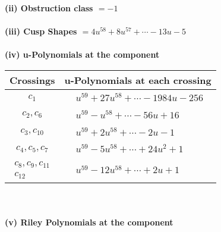 \documentclass[1p]{elsarticle_modified}
\theoremstyle{definition}
\begin{document}
\flushleft \textbf{(ii) Obstruction class $= -1$}\\~\\
\flushleft \textbf{(iii) Cusp Shapes $= 4 u^{58}+8 u^{57}+\cdots-13 u-5$}\\~\\
\newpage\renewcommand{\arraystretch}{1}
\flushleft \textbf{(iv) u-Polynomials at the component}\newline \\
\begin{tabular}{m{50pt}|m{274pt}}
Crossings & \hspace{64pt}u-Polynomials at each crossing \\
\hline $$\begin{aligned}c_{1}\end{aligned}$$&$\begin{aligned}
&u^{59}+27 u^{58}+\cdots-1984 u-256
\end{aligned}$\\
\hline $$\begin{aligned}c_{2},c_{6}\end{aligned}$$&$\begin{aligned}
&u^{59}- u^{58}+\cdots-56 u+16
\end{aligned}$\\
\hline $$\begin{aligned}c_{3},c_{10}\end{aligned}$$&$\begin{aligned}
&u^{59}+2 u^{58}+\cdots-2 u-1
\end{aligned}$\\
\hline $$\begin{aligned}c_{4},c_{5},c_{7}\end{aligned}$$&$\begin{aligned}
&u^{59}-5 u^{58}+\cdots+24 u^2+1
\end{aligned}$\\
\hline $$\begin{aligned}c_{8},c_{9},c_{11}\\c_{12}\end{aligned}$$&$\begin{aligned}
&u^{59}-12 u^{58}+\cdots+2 u+1
\end{aligned}$\\
\hline
\end{tabular}\\~\\
\newpage\renewcommand{\arraystretch}{1}
\flushleft \textbf{(v) Riley Polynomials at the component}\newline \\
\end{document}
